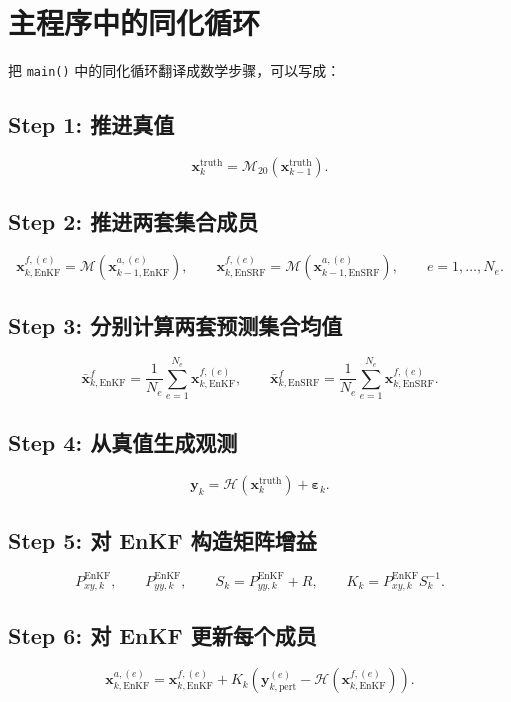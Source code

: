 \documentclass[12pt,a4paper]{article}
\begin{document}
\section{主程序中的同化循环}

把 \texttt{main()} 中的同化循环翻译成数学步骤，可以写成：

\subsection*{Step 1: 推进真值}
\[
\mathbf{x}^{\mathrm{truth}}_k
= \mathcal{M}_{20}\left(\mathbf{x}^{\mathrm{truth}}_{k-1}\right).
\]

\subsection*{Step 2: 推进两套集合成员}
\[
\mathbf{x}^{f,(e)}_{k,\mathrm{EnKF}}
= \mathcal{M}\left(\mathbf{x}^{a,(e)}_{k-1,\mathrm{EnKF}}\right),
\qquad
\mathbf{x}^{f,(e)}_{k,\mathrm{EnSRF}}
= \mathcal{M}\left(\mathbf{x}^{a,(e)}_{k-1,\mathrm{EnSRF}}\right),
\qquad e=1,\dots,N_e.
\]

\subsection*{Step 3: 分别计算两套预测集合均值}
\[
\bar{\mathbf{x}}^f_{k,\mathrm{EnKF}}
= \frac{1}{N_e}\sum_{e=1}^{N_e}\mathbf{x}^{f,(e)}_{k,\mathrm{EnKF}},
\qquad
\bar{\mathbf{x}}^f_{k,\mathrm{EnSRF}}
= \frac{1}{N_e}\sum_{e=1}^{N_e}\mathbf{x}^{f,(e)}_{k,\mathrm{EnSRF}}.
\]

\subsection*{Step 4: 从真值生成观测}
\[
\mathbf{y}_k
= \mathcal{H}\left(\mathbf{x}^{\mathrm{truth}}_k\right)
+ \boldsymbol{\varepsilon}_k.
\]

\subsection*{Step 5: 对 EnKF 构造矩阵增益}
\[
P_{xy,k}^{\mathrm{EnKF}},\qquad
P_{yy,k}^{\mathrm{EnKF}},\qquad
S_k = P_{yy,k}^{\mathrm{EnKF}}+R,\qquad
K_k = P_{xy,k}^{\mathrm{EnKF}}S_k^{-1}.
\]

\subsection*{Step 6: 对 EnKF 更新每个成员}
\[
\mathbf{x}^{a,(e)}_{k,\mathrm{EnKF}}
= \mathbf{x}^{f,(e)}_{k,\mathrm{EnKF}}
+ K_k
\left(
\mathbf{y}^{(e)}_{k,\mathrm{pert}} - \mathcal{H}(\mathbf{x}^{f,(e)}_{k,\mathrm{EnKF}})
\right).
\]
\end{document}
